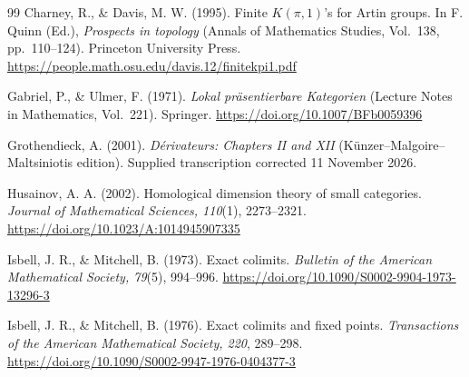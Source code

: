 \documentclass[11pt,a4paper]{article}
\theoremstyle{definition}
\begin{document}
\begin{thebibliography}{99}
Charney, R., \& Davis, M. W. (1995).
Finite $K(\pi,1)$'s for Artin groups.
In F. Quinn (Ed.), \emph{Prospects in topology}
(Annals of Mathematics Studies, Vol.~138, pp.~110--124).
Princeton University Press.
\url{https://people.math.osu.edu/davis.12/finitekpi1.pdf}
\par{}

Gabriel, P., \& Ulmer, F. (1971).
\emph{Lokal pr\"asentierbare Kategorien}
(Lecture Notes in Mathematics, Vol.~221). Springer.
\url{https://doi.org/10.1007/BFb0059396}
\par{}

Grothendieck, A. (2001). \emph{D\'erivateurs: Chapters II and XII}
(K\"unzer--Malgoire--Maltsiniotis edition).
Supplied transcription corrected 11 November 2026.
\par{}

Husainov, A. A. (2002).
Homological dimension theory of small categories.
\emph{Journal of Mathematical Sciences, 110}(1), 2273--2321.
\url{https://doi.org/10.1023/A:1014945907335}
\par{}

Isbell, J. R., \& Mitchell, B. (1973). Exact colimits.
\emph{Bulletin of the American Mathematical Society, 79}(5), 994--996.
\url{https://doi.org/10.1090/S0002-9904-1973-13296-3}
\par{}

Isbell, J. R., \& Mitchell, B. (1976).
Exact colimits and fixed points.
\emph{Transactions of the American Mathematical Society, 220}, 289--298.
\url{https://doi.org/10.1090/S0002-9947-1976-0404377-3}
\par{}


\end{thebibliography}
\end{document}
